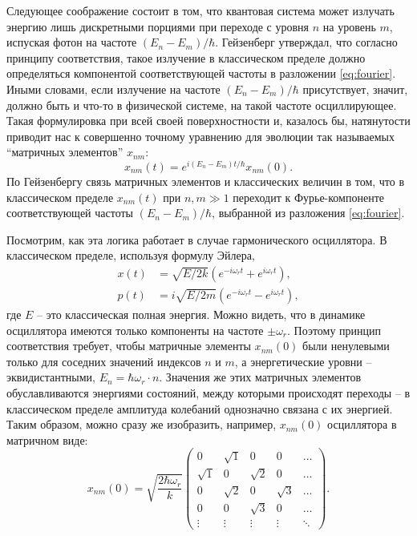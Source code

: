 \documentclass[14pt, a4paper]{extreport}
\numberwithin{equation}{section}
\begin{document}
Следующее соображение состоит в том, что квантовая система может излучать энергию лишь дискретными порциями при переходе с уровня $n$ на уровень $m$, испуская фотон на частоте $(E_n - E_m)/\hbar$. Гейзенберг утверждал, что согласно принципу соответствия, такое излучение в классическом пределе должно определяться компонентой соответствующей частоты в разложении \eqref{eq:fourier}. Иными словами, если излучение на частоте $(E_n - E_m)/\hbar$ присутствует, значит, должно быть и что-то в физической системе, на такой частоте осциллирующее. Такая формулировка при всей своей поверхностности и, казалось бы, натянутости приводит нас к совершенно точному уравнению для эволюции так называемых ``матричных элементов'' $x_{nm}$:
\begin{equation}
	x_{nm}(t) = e^{i (E_n - E_m) t / \hbar} x_{nm}(0).\label{eq:heisenberg_evolution}
\end{equation}
По Гейзенбергу связь матричных элементов и классических величин в том, что в классическом пределе $x_{nm}(t)$ при $n, m \gg 1$ переходит к Фурье-компоненте соответствующей частоты $(E_n - E_m)/\hbar$, выбранной из разложения \eqref{eq:fourier}. 

Посмотрим, как эта логика работает в случае гармонического осциллятора. В классическом пределе, используя формулу Эйлера,
\begin{align}
	x(t) &= \sqrt{E/2k} (e^{-i\omega_r t} + e^{i\omega_r t}),\\
	p(t) &= i\sqrt{E/2m} (e^{-i\omega_r t} - e^{i\omega_r t}),
\end{align}
где $ E $ -- это классическая полная энергия. Можно видеть, что в динамике осциллятора имеются только компоненты на частоте $\pm \omega_r$. Поэтому принцип соответствия требует, чтобы матричные элементы $x_{nm}(0)$ были ненулевыми только для соседних значений индексов $n$ и $m$, а энергетические уровни -- эквидистантными, $E_n = \hbar \omega_r \cdot n$. Значения же этих матричных элементов обуславливаются энергиями состояний, между которыми происходят переходы -- в классическом пределе амплитуда колебаний однозначно связана с их энергией. Таким образом, можно сразу же изобразить, например, $x_{nm}(0)$ осциллятора в матричном виде:
\begin{equation}
	x_{nm}(0) = \sqrt{\frac{2\hbar \omega_r}{k}}\left(	\begin{matrix}
	0 & \sqrt{1} & 0 & 0&  \dots \\
	\sqrt{1} & 0 &\sqrt{2} & 0& \dots \\
	0 & \sqrt{2} & 0 & \sqrt{3} &  \dots\\
	0 & 0 & \sqrt{3} & 0 & \dots \\
	\vdots & \vdots & \vdots & \vdots  & \ddots
	\end{matrix}\right).
\end{equation}
\end{document}
